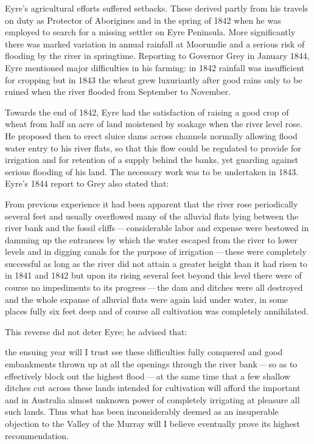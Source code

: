 Eyre's agricultural efforts suffered setbacks.  These derived partly
from his travels on duty as Protector of Aborigines and in the spring
of 1842 when he was employed to search for a missing settler on Eyre
Peninsula.  More significantly there was marked
variation in annual rainfall at Moorundie and a serious risk of
flooding by the river in springtime.  Reporting to Governor Grey in
January 1844, Eyre mentioned major difficulties in his farming: in
1842 rainfall was insufficient for cropping but in 1843 the wheat grew
luxuriantly after good rains only to be ruined when the river flooded
from September to Nov\-ember.

Towards the end of 1842, Eyre had the satisfaction of raising a good
crop of wheat from half an acre of land moistened by soakage when the
river level rose.  He proposed then to erect sluice dams across
channels normally allowing flood water entry to his river flats, so
that this flow could be regulated to provide for irrigation and for
retention of a supply behind the banks, yet guarding against serious
flooding of his land.  The
necessary work was to be undertaken in 1843.  Eyre's 1844 report to
Grey also stated that:
\begin{Quote}
	From previous experience it had been apparent that the river
	rose periodically several feet and usually overflowed many of
	the alluvial flats lying between the river bank and the fossil
	cliffs\,---\,considerable labor and expense were bestowed in
	damming up the entrances by which the water escaped from the
	river to lower levels and in digging canals for the purpose of
	irrigation\,---\,these were completely successful as long as the
	river did not attain a greater height than it had risen to in
	1841 and 1842 but upon its rising several feet beyond this
	level there were of course no impediments to its
	progress\,---\,the dam and ditches were all destroyed and the
	whole expanse of alluvial flats were again laid under water,
	in some places fully six feet deep and of course all
	cultivation was completely annihilated.
\end{Quote}

This reverse did not deter Eyre; he advised that:
\begin{Quote}
	the ensuing year will I trust see these difficulties fully
        conquered and good embankments thrown up at all the openings
        through the river bank\,---\,so as to effectively block out the
        highest flood\,---\,at the same time that a few shallow ditches
        cut across these lands intended for cultivation will afford
        the important and in Australia almost unknown power of
        completely irrigating at pleasure all such lands. Thus what
        has been inconsiderably deemed as an insuperable objection to
        the Valley of the Murray will I believe eventually prove its
        highest recommend\-ation.
\end{Quote}

